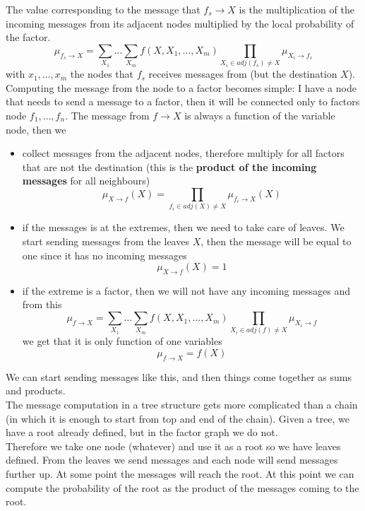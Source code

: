             The value corresponding to the message that $f_s \rightarrow X$ is the multiplication of the incoming messages from its adjacent nodes multiplied by the local probability of the factor.
            $$\mu_{f_s \rightarrow X} = \sum_{X_1}\dots\sum_{X_{m}} f(X, X_1, \dots, X_m) \prod _{X_i \in adj(f_s) \neq X} \mu_{X_i \rightarrow f_s}$$
            with $x_1, \dots, x_m$ the nodes that $f_s$ receives messages from (but the destination $X$).\\
            
            Computing the message from the node to a factor becomes simple: 
            I have a node that needs to send a message to a factor, then it will be connected only to factors node $f_1, \dots, f_n$. The message from $f \rightarrow X$ is always a function of the variable node, then we
            \begin{itemize}
                \item collect messages from the adjacent nodes, therefore multiply for all factors that are not the destination (this is the \textbf{product of the incoming messages} for all neighbours)
                $$\mu _ {X \rightarrow f} (X) = \prod _{f_i \in adj(X) \neq X} \mu _{f_i \rightarrow X} (X)$$
                \item if the messages is at the extremes, then we need to take care of leaves. We start sending messages from the leaves $X$, then the message will be equal to one since it has no incoming messages
                $$\mu _{X \rightarrow f}(X) = 1$$
                \item if the extreme is a factor, then we will not have any incoming messages and from this
                $$\mu_{f \rightarrow X} = \sum_{X_1}\dots\sum_{X_{m}} f(X, X_1, \dots, X_m) \prod _{X_i \in adj(f) \neq X} \mu_{X_i \rightarrow f}$$
                we get that it is only function of one variables
                $$\mu_{f \rightarrow X} = f(X)$$
            \end{itemize}
            We can start sending messages like this, and then things come together as sums and products.\\
            
            The message computation in a tree structure gets more complicated than a chain (in which it is enough to start from top and end of the chain). Given a tree, we have a root already defined, but in the factor graph we do not.\\
            Therefore we take one node (whatever) and use it as a root so we have leaves defined. From the leaves we send messages and each node will send messages further up. At some point the messages will reach the root. At this point we can compute the probability of the root as the product of the messages coming to the root.
            
